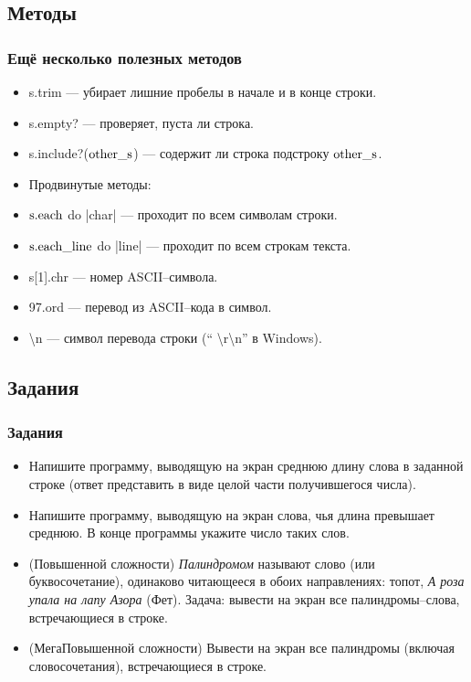 \documentclass[compress,red]{beamer}
\begin{document}
\subsection{Методы}
\begin{frame}[fragile]
  \frametitle{Ещё несколько полезных методов}

  \begin{itemize}
    \item s.trim --- убирает лишние пробелы в начале и в конце строки.
    \item s.empty? --- проверяет, пуста ли строка.
    \item s.include?($\rm{other\_s}$) --- содержит ли строка подстроку $\rm{other\_s}$.
    \item Продвинутые методы:
    \item $\rm{s.each}$ do |char| --- проходит по всем символам строки.
    \item $\rm{s.each\_line}$ do |line| --- проходит по всем строкам текста.
    \item s[1].chr --- номер ASCII--символа.
    \item 97.ord --- перевод из ASCII--кода в символ.
    \item  \textbackslash n --- символ перевода строки (`` \textbackslash r\textbackslash n'' в Windows).
  \end{itemize}
  
\end{frame}

\subsection{Задания}
\begin{frame}
  \frametitle{Задания}
  \begin{itemize}
    \item Напишите программу, выводящую на экран среднюю длину слова в заданной строке (ответ представить в виде целой части получившегося числа).
    \item Напишите программу, выводящую на экран слова, чья длина превышает среднюю. В конце программы укажите число таких слов.
    \item (Повышенной сложности) \emph{Палиндромом} называют слово (или буквосочетание), одинаково читающееся в обоих направлениях: топот, \emph{А роза упала на лапу Азора} (Фет). Задача: вывести на экран все палиндромы--слова, встречающиеся в строке.
    \item (МегаПовышенной сложности) Вывести на экран все палиндромы (включая словосочетания), встречающиеся в строке.
  \end{itemize}
\end{frame}
\end{document}
